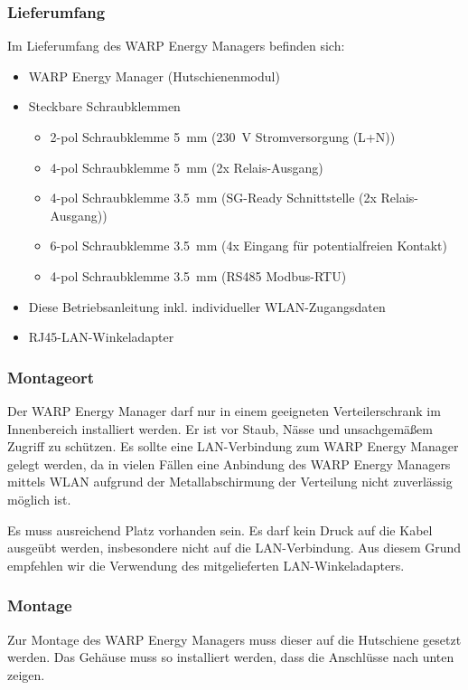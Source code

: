 \documentclass[a4paper,10pt]{article}
\begin{document}
\begin{multicols*}{2}
	\subsubsection{Lieferumfang}
	Im Lieferumfang des WARP Energy Managers befinden sich:
	\begin{itemize}
		\item WARP Energy Manager (Hutschienenmodul)
		\item Steckbare Schraubklemmen
		\begin{itemize}
			\item 2-pol Schraubklemme \SI{5}{\milli\meter} (\SI{230}{\volt} Stromversorgung (L+N))
			\item 4-pol Schraubklemme \SI{5}{\milli\meter} (2x Relais-Ausgang)
			\item 4-pol Schraubklemme \SI{3.5}{\milli\meter} (SG-Ready Schnittstelle (2x Relais-Ausgang))
			\item 6-pol Schraubklemme \SI{3.5}{\milli\meter} (4x Eingang für potentialfreien Kontakt)
			\item 4-pol Schraubklemme \SI{3.5}{\milli\meter} (RS485 Modbus-RTU)
		\end{itemize}
		\item Diese Betriebsanleitung inkl. individueller WLAN-Zugangsdaten
		\item RJ45-LAN-Winkeladapter
	\end{itemize}

	\subsubsection{Montageort}
	Der WARP Energy Manager darf nur in einem geeigneten Verteilerschrank im
	Innenbereich installiert werden. Er ist vor Staub, Nässe und unsachgemäßem
	Zugriff zu schützen. Es sollte
	eine LAN-Verbindung zum WARP Energy Manager gelegt werden, da in vielen
	Fällen eine Anbindung des WARP Energy Managers mittels WLAN aufgrund
	der Metallabschirmung der Verteilung nicht zuverlässig möglich ist.

	Es muss ausreichend Platz vorhanden sein. Es darf kein Druck auf die Kabel
	ausgeübt werden, insbesondere nicht auf die LAN-Verbindung. Aus diesem Grund
	empfehlen wir die Verwendung des mitgelieferten LAN-Winkeladapters.

	\subsubsection{Montage}
	Zur Montage des WARP Energy Managers muss dieser auf die Hutschiene
	gesetzt werden. Das Gehäuse muss so installiert werden, dass die Anschlüsse
	nach unten zeigen.


\end{multicols*}
\end{document}
